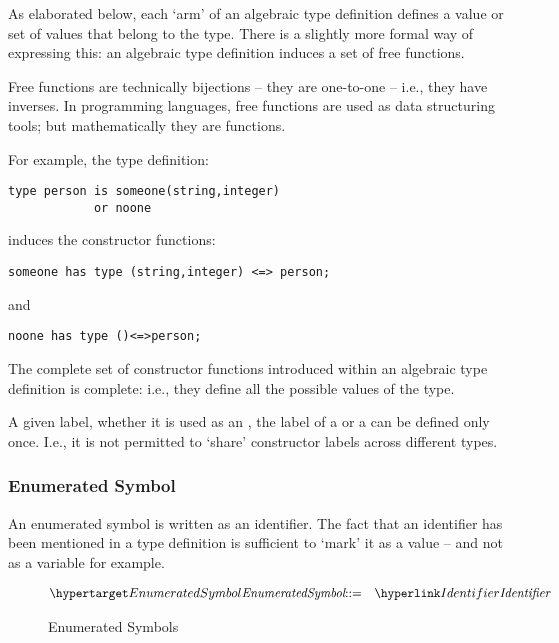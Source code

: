 \begin{aside}
As elaborated below, each `arm' of an algebraic type definition defines a value or set of values that belong to the type. There is a slightly more formal way of expressing this: an algebraic type definition induces a set of free functions. 

\begin{aside}
Free functions are technically bijections -- they are one-to-one -- i.e., they have inverses. In programming languages, free functions are used as data structuring tools; but mathematically they are functions.
\end{aside}

For example, the type definition:
\begin{lstlisting}
type person is someone(string,integer) 
            or noone
\end{lstlisting}
induces the constructor functions:
\begin{lstlisting}
someone has type (string,integer) <=> person;
\end{lstlisting}
and
\begin{lstlisting}
noone has type ()<=>person;
\end{lstlisting}
The complete set of constructor functions introduced within an algebraic type definition is complete: i.e., they define all the possible values of the type.
\end{aside}

\begin{aside}
A given label, whether it is used as an , the label of a  or a  can be defined only once. I.e., it is not permitted to `share' constructor labels across different types.
\end{aside}

\subsubsection{Enumerated Symbol}
\label{enumSymbol}
An enumerated symbol is written as an identifier. The fact that an identifier has been mentioned in a type definition is sufficient to `mark' it as a value -- and not as a variable for example.
\begin{figure}[htbp]
\begin{eqnarray*}
\ntDef{EnumeratedSymbol}&\arrow&\ntRef{Identifier}
\end{eqnarray*}
\caption{Enumerated Symbols}
\label{enumSymbolFig}
\end{figure}


